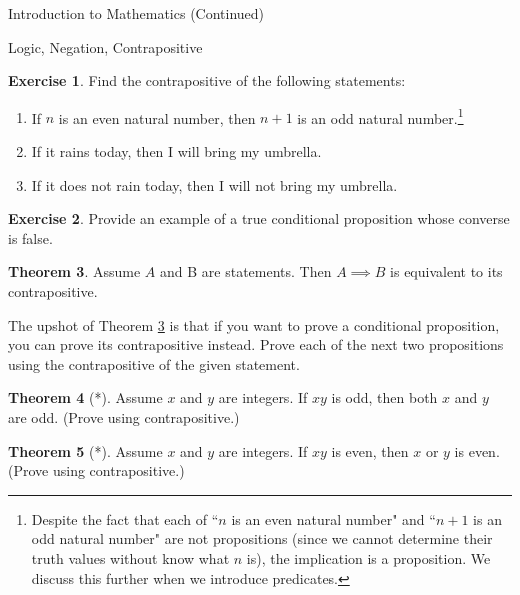 \documentclass[11pt]{article}
\theoremstyle{definition}
\newtheorem{theorem}{Theorem}[section]
\newtheorem{exercise}[theorem]{Exercise}
\begin{document}
\begin{section}{Introduction to Mathematics (Continued)}
\begin{subsection}{Logic, Negation, Contrapositive}
\begin{exercise} Find the contrapositive of the following statements: 
\begin{enumerate}
\item If $n$ is an even natural number, then $n+1$ is an odd natural number.\footnote{Despite the fact that each of ``$n$ is an even natural number" and ``$n+1$ is an odd natural number" are not propositions (since we cannot determine their truth values without know what $n$ is), the implication is a proposition.  We discuss this further when we introduce predicates.}
\item If it rains today, then I will bring my umbrella.
\item If it does not rain today, then I will not bring my umbrella.
\end{enumerate} \end{exercise}

\begin{exercise}
Provide an example of a true conditional proposition whose converse is false.
\end{exercise}

\begin{theorem}\label{thm:contrapos}
Assume $A$ and B are statements.  Then ${A\implies B}$ is equivalent to its contrapositive.
\end{theorem}

The upshot of Theorem \ref{thm:contrapos} is that if you want to prove a conditional proposition, you can prove its contrapositive instead.  Prove each of the next two propositions using the contrapositive of the given statement.

\begin{theorem}[*]
Assume $x$ and $y$ are integers.  If $xy$ is odd, then both $x$ and $y$ are odd. (Prove using contrapositive.)
\end{theorem}

\begin{theorem}[*]
Assume $x$ and $y$ are integers.  If $xy$ is even, then $x$ or $y$ is even.  (Prove using contrapositive.)
\end{theorem}

\end{subsection}

\end{section}
\end{document}
